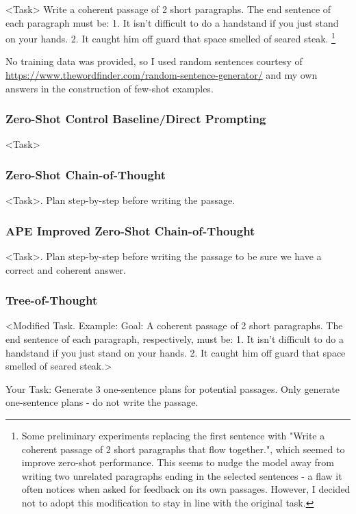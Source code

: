 \documentclass[11pt]{article}
\begin{document}
<Task> Write a coherent passage of 2 short paragraphs. The end sentence of each paragraph must be: 1. It isn't difficult to do a handstand if you just stand on your hands. 2. It caught him off guard that space smelled of seared steak. \footnote{Some preliminary experiments replacing the first sentence with "Write a coherent passage of 2 short paragraphs that flow together.", which seemed to improve zero-shot performance. This seems to nudge the model away from writing two unrelated paragraphs ending in the selected sentences - a flaw it often notices when asked for feedback on its own passages. However, I decided not to adopt this modification to stay in line with the original task.}

No training data was provided, so I used random sentences courtesy of \url{https://www.thewordfinder.com/random-sentence-generator/} and my own answers in the construction of few-shot examples.

\subsubsection*{Zero-Shot Control Baseline/Direct Prompting}

<Task>

\subsubsection*{Zero-Shot Chain-of-Thought}

<Task>. Plan step-by-step before writing the passage.

\subsubsection*{APE Improved Zero-Shot Chain-of-Thought}

<Task>. Plan step-by-step before writing the passage to be sure we have a correct and coherent answer.

\subsubsection*{Tree-of-Thought}

<Modified Task. Example: Goal: A coherent passage of 2 short paragraphs. The end sentence of each paragraph, respectively, must be: 1. It isn't difficult to do a handstand if you just stand on your hands. 2. It caught him off guard that space smelled of seared steak.>

Your Task: Generate 3 one-sentence plans for potential passages. Only generate one-sentence plans - do not write the passage.
\end{document}

